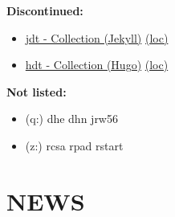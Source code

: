 \documentclass[
]{book}
\providecommand{\tightlist}{%
  \setlength{\itemsep}{0pt}\setlength{\parskip}{0pt}}
\begin{document}
\textbf{Discontinued:}

\begin{itemize}
\tightlist
\item
  \href{https://dyrehaugen.github.io/jdt}{jdt - Collection (Jekyll)} \href{http://localhost/jdt}{(loc)}
\item
  \href{https://dyrehaugen.github.io/hdt}{hdt - Collection (Hugo)} \href{http://localhost/hdt}{(loc)}
\end{itemize}

\textbf{Not listed:}

\begin{itemize}
\tightlist
\item
  (q:) dhe dhn jrw56
\item
  (z:) rcsa rpad rstart
\end{itemize}

\hypertarget{news}{%
\chapter{NEWS}\label{news}}

  
\end{document}
